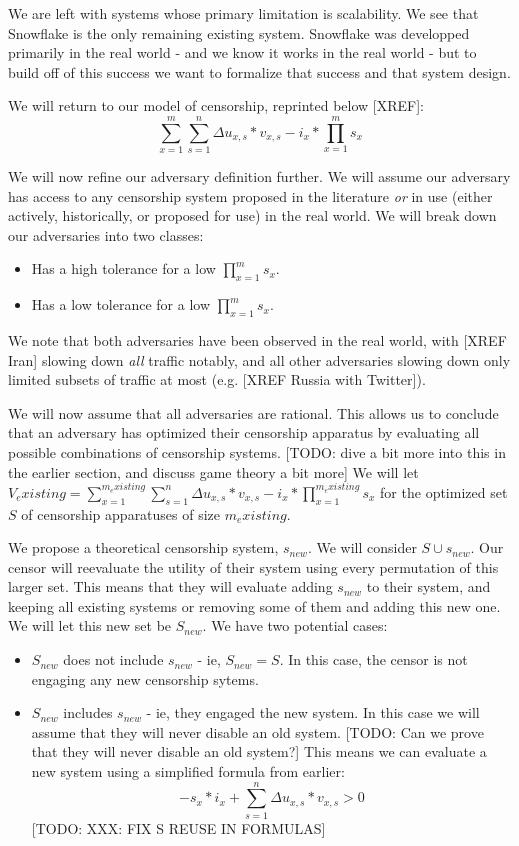 \documentclass[12pt]{report}
\begin{document}
We are left with systems whose primary limitation is scalability. We see that Snowflake is the only remaining existing system. Snowflake was developped primarily in the real world - and we know it works in the real world - but to build off of this success we want to formalize that success and that system design.

We will return to our model of censorship, reprinted below [XREF]:
\begin{equation}
\sum_{x=1}^{m}\sum_{s=1}^{n}\Delta u_{x,s}*v_{x,s} - i_{x} * \prod_{x=1}^{m}s_x
\end{equation}

We will now refine our adversary definition further. We will assume our adversary has access to any censorship system proposed in the literature \emph{or} in use (either actively, historically, or proposed for use) in the real world. We will break down our adversaries into two classes:
\begin{itemize}
  \item Has a high tolerance for a low $\prod_{x=1}^{m}s_x$.
  \item Has a low tolerance for a low $\prod_{x=1}^{m}s_x$.
\end{itemize}
We note that both adversaries have been observed in the real world, with [XREF Iran] slowing down \emph{all} traffic notably, and all other adversaries slowing down only limited subsets of traffic at most (e.g. [XREF Russia with Twitter]).

We will now assume that all adversaries are rational. This allows us to conclude that an adversary has optimized their censorship apparatus by evaluating all possible combinations of censorship systems. [TODO: dive a bit more into this in the earlier section, and discuss game theory a bit more] We will let $V_existing = \sum_{x=1}^{m_existing}\sum_{s=1}^{n}\Delta u_{x,s}*v_{x,s} - i_{x} * \prod_{x=1}^{m_existing}s_x$ for the optimized set $S$ of censorship apparatuses of size $m_existing$.

We propose a theoretical censorship system, $s_{new}$. We will consider $S \cup {s_{new}}$. Our censor will reevaluate the utility of their system using every permutation of this larger set. This means that they will evaluate adding $s_{new}$ to their system, and keeping all existing systems or removing some of them and adding this new one. We will let this new set be $S_{new}$. We have two potential cases:
\begin{itemize}
  \item $S_{new}$ does not include $s_{new}$ - ie, $S_{new} = S$. In this case, the censor is not engaging any new censorship sytems.
  \item $S_{new}$ includes $s_{new}$ - ie, they engaged the new system. In this case we will assume that they will never disable an old system. [TODO: Can we prove that they will never disable an old system?] This means we can evaluate a new system using a simplified formula from earlier:
  \begin{equation}
-s_x*i_x + \sum_{s=1}^{n}\Delta u_{x,s}*v_{x,s} > 0
  \end{equation}
  [TODO: XXX: FIX S REUSE IN FORMULAS]
\end{itemize}
\end{document}
